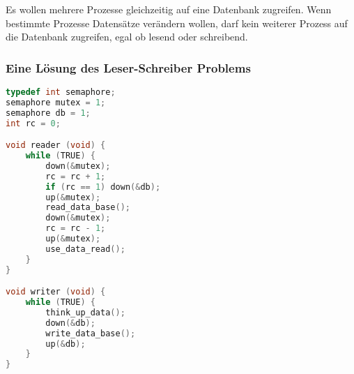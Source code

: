 Es wollen mehrere Prozesse gleichzeitig auf eine Datenbank zugreifen. Wenn
bestimmte Prozesse Datensätze verändern wollen, darf kein weiterer Prozess auf
die Datenbank zugreifen, egal ob lesend oder schreibend.

\subsubsection{Eine Lösung des Leser-Schreiber Problems}

\begin{lstlisting}[language=C]
typedef int semaphore;
semaphore mutex = 1;
semaphore db = 1;
int rc = 0;

void reader (void) {
    while (TRUE) {
        down(&mutex);
        rc = rc + 1;
        if (rc == 1) down(&db);
        up(&mutex);
        read_data_base();
        down(&mutex);
        rc = rc - 1;
        up(&mutex);
        use_data_read();
    }
}

void writer (void) {
    while (TRUE) {
        think_up_data();
        down(&db);
        write_data_base();
        up(&db);
    }
}
\end{lstlisting}
